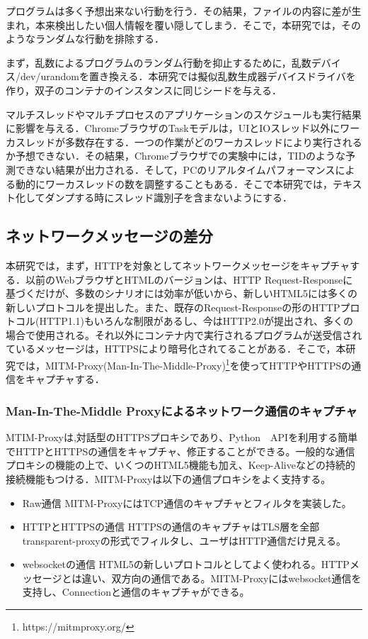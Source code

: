\documentclass[submit,techrep]{ipsj}
\begin{document}
プログラムは多く予想出来ない行動を行う．その結果，ファイルの内容に差が生まれ，本来検出したい個人情報を覆い隠してしまう．そこで，本研究では，そのようなランダムな行動を排除する．

まず，乱数によるプログラムのランダム行動を抑止するために，乱数デバイス/dev/urandomを置き換える．本研究では擬似乱数生成器デバイスドライバを作り，双子のコンテナのインスタンスに同じシードを与える．

マルチスレッドやマルチプロセスのアプリケーションのスケジュールも実行結果に影響を与える．ChromeブラウザのTaskモデルは，UIとIOスレッド以外にワーカスレッドが多数存在する．一つの作業がどのワーカスレッドにより実行されるか予想できない．その結果，Chromeブラウザでの実験中には，TIDのような予測できない結果が出力される．そして，PCのリアルタイムパフォーマンスによる動的にワーカスレッドの数を調整することもある\cite{dynamic}．そこで本研究では，テキスト化してダンプする時にスレッド識別子を含まないようにする．

\subsection{ネットワークメッセージの差分}
\label{sec:net}

本研究では，まず，HTTPを対象としてネットワークメッセージをキャプチャする．以前のWebブラウザとHTMLのバージョンは、HTTP Request-Responseに基づくだけが、多数のシナリオには効率が低いから、新しいHTML5には多くの新しいプロトコルを提出した。また、既存のRequest-Responseの形のHTTPプロトコル(HTTP1.1)もいろんな制限があるし、今はHTTP2.0が提出され、多くの場合で使用される。それ以外にコンテナ内で実行されるプログラムが送受信されているメッセージは，HTTPSにより暗号化されてることがある．そこで，本研究では，MITM-Proxy(Man-In-The-Middle-Proxy)\footnote{https://mitmproxy.org/}を使ってHTTPやHTTPSの通信をキャプチャする．

\subsubsection{Man-In-The-Middle Proxyによるネットワーク通信のキャプチャ}

MTIM-Proxyは,対話型のHTTPSプロキシであり、Python　APIを利用する簡単でHTTPとHTTPSの通信をキャプチャ、修正することができる。一般的な通信プロキシの機能の上で、いくつのHTML5機能も加え、Keep-Aliveなどの持続的接続機能もつける．MITM-Proxyは以下の通信プロキシをよく支持する。
\begin{itemize}
\item
Raw通信
MITM-ProxyにはTCP通信のキャプチャとフィルタを実装した。
\item
HTTPとHTTPSの通信
HTTPSの通信のキャプチャはTLS層を全部transparent-proxyの形式でフィルタし、ユーザはHTTP通信だけ見える。
\item
websocketの通信
HTML5の新しいプロトコルとしてよく使われる。HTTPメッセージとは違い、双方向の通信である。MITM-Proxyにはwebsocket通信を支持し、Connectionと通信のキャプチャができる。

\end{itemize}
\end{document}
